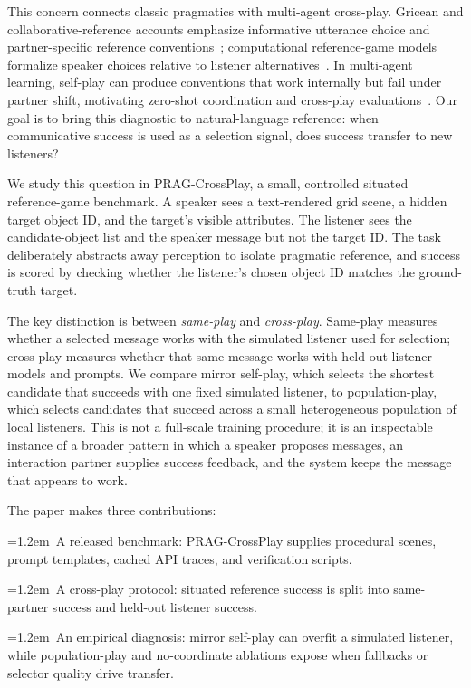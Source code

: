 This concern connects classic pragmatics with multi-agent cross-play. Gricean and collaborative-reference accounts emphasize informative utterance choice and partner-specific reference conventions~\cite{grice1975logic,clark1986referring,brennan1996conceptual}; computational reference-game models formalize speaker choices relative to listener alternatives~\cite{dale1995computational,frank2012predicting,goodman2016pragmatic,andreas2016reasoning}. In multi-agent learning, self-play can produce conventions that work internally but fail under partner shift, motivating zero-shot coordination and cross-play evaluations~\cite{foerster2016learning,lazaridou2017multiagent,carroll2019utility,hu2020otherplay,lucas2022anyplay}. Our goal is to bring this diagnostic to natural-language reference: when communicative success is used as a selection signal, does success transfer to new listeners?

We study this question in PRAG-CrossPlay, a small, controlled situated reference-game benchmark. A speaker sees a text-rendered grid scene, a hidden target object ID, and the target's visible attributes. The listener sees the candidate-object list and the speaker message but not the target ID. The task deliberately abstracts away perception to isolate pragmatic reference, and success is scored by checking whether the listener's chosen object ID matches the ground-truth target.

The key distinction is between \emph{same-play} and \emph{cross-play}. Same-play measures whether a selected message works with the simulated listener used for selection; cross-play measures whether that same message works with held-out listener models and prompts. We compare mirror self-play, which selects the shortest candidate that succeeds with one fixed simulated listener, to population-play, which selects candidates that succeed across a small heterogeneous population of local listeners. This is not a full-scale training procedure; it is an inspectable instance of a broader pattern in which a speaker proposes messages, an interaction partner supplies success feedback, and the system keeps the message that appears to work.

The paper makes three contributions:
\par\noindent\hangindent=1.2em\textbullet\ A released benchmark: PRAG-CrossPlay supplies procedural scenes, prompt templates, cached API traces, and verification scripts.
\par\noindent\hangindent=1.2em\textbullet\ A cross-play protocol: situated reference success is split into same-partner success and held-out listener success.
\par\noindent\hangindent=1.2em\textbullet\ An empirical diagnosis: mirror self-play can overfit a simulated listener, while population-play and no-coordinate ablations expose when fallbacks or selector quality drive transfer.

